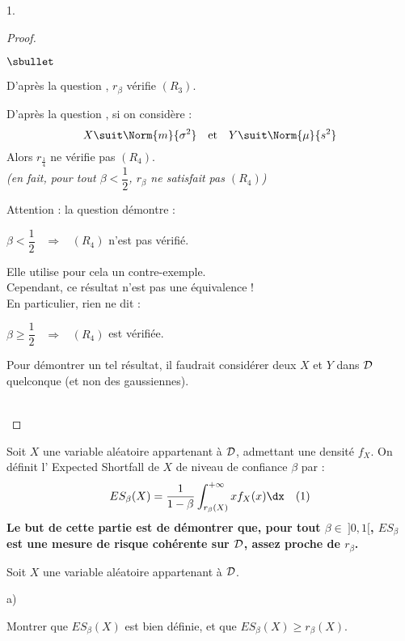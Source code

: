 \documentclass[11pt]{article}%
\begin{document}
\begin{noliste}{1.}
\begin{proof}
\begin{noliste}{$\sbullet$}
      \item D'après la question , $r_\beta$ vérifie $(R_3)$.
      
      \item D'après la question , si on considère :
      \[
        X \suit \Norm{m}{\sigma^2} \quad \text{et} \quad 
        Y \suit \Norm{\mu}{s^2}
      \]
      Alors $r_{\frac{1}{4}}$ ne vérifie pas $(R_4)$.\\
      {\it (en fait, pour tout $\beta < \dfrac{1}{2}$, $r_\beta$ ne 
      satisfait pas $(R_4)$)}
    \end{noliste}
    \conc{On en déduit que $r_\beta$ n'est pas une mesure de risque
    cohérente pour tout $\beta \in \ ]0,1[$.}
    
    \begin{remark}
      Attention : la question  démontre :
      \begin{center}
        $\beta <\dfrac{1}{2}$ \ $\Rightarrow$ \ $(R_4)$ n'est pas 
	vérifié.
      \end{center}
      Elle utilise pour cela un contre-exemple.\\
      Cependant, ce résultat n'est pas une équivalence !\\
      En particulier, rien ne dit :
      \begin{center}
        $\beta \geq \dfrac{1}{2}$ \ $\Rightarrow$ \ $(R_4)$ est 
	vérifiée.
      \end{center}
      Pour démontrer un tel résultat, il faudrait considérer deux \var 
      $X$ et $Y$ dans ${\cal D}$ quelconque (et non des \var 
      gaussiennes).
    \end{remark}~\\[-1.4cm]
  \end{proof}

  Soit $X$ une variable aléatoire appartenant à ${\cal D}$, 
  admettant une densité $f_X$. On définit l' \og Expected 
  Shortfall\fg{} de $X$ de niveau de confiance $\beta$ par :
  \[
    ES_\beta(X)=\dfrac1{1-\beta} \int_{r_\beta(X)}^{+\infty} x 
    f_X(x) \dx \quad(1)
  \]
  {\bf Le but de cette partie est de démontrer que, pour tout 
  $\beta \in \ ]0,1[$, $ES_\beta$ est une mesure de risque cohérente 
  sur ${\cal D}$, assez \og proche \fg{} de $r_\beta$.}
  
  \item Soit $X$ une variable aléatoire appartenant à ${\cal D}$.
  \begin{noliste}{a)}
    \setlength{\itemsep}{2mm}
    \item Montrer que $ES_\beta(X)$ est bien définie, et que 
    $ES_\beta(X) \geq r_\beta(X)$.
    

\end{noliste}
\end{noliste}
\end{document}
